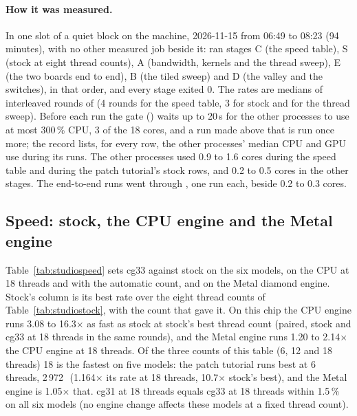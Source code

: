 \paragraph{How it was measured.} In one slot of a quiet block on the machine, 2026-11-15 from 06:49 to 08:23 (94
minutes), with no other measured job beside it:  ran stages C (the speed table), S
(stock at eight thread counts), A (bandwidth, kernels and the thread sweep), E (the two boards end to end), B (the tiled
sweep) and D (the valley and the switches), in that order, and every stage exited 0. The rates are medians of interleaved
rounds of  (4 rounds for the speed table, 3 for stock and for the thread sweep). Before each run the gate
() waits up to 20\,s for the other processes to use at most 300\,\% CPU, 3 of the 18 cores,
and a run made above that is run once more; the record lists, for every row, the other processes' median CPU and GPU use during
its runs. The other processes used 0.9 to 1.6 cores during the speed table and during the patch tutorial's stock rows,
and 0.2 to 0.5 cores in the other stages. The end-to-end runs went through , one run each, beside 0.2
to 0.3 cores.

\subsection*{Speed: stock, the CPU engine and the Metal engine}
Table~\ref{tab:studiospeed} sets cg33 against stock on the six models, on the CPU at 18 threads and with the automatic
count, and on the Metal diamond engine. Stock's column is its best rate over the eight thread counts of
Table~\ref{tab:studiostock}, with the count that gave it. On this chip the CPU engine runs 3.08 to 16.3$\times$ as fast as
stock at stock's best thread count (paired, stock and cg33 at 18 threads in the same rounds), and the Metal engine runs
1.20 to 2.14$\times$ the CPU engine at 18 threads. Of the three counts of this table (6, 12 and 18 threads) 18 is the fastest on five models: the
patch tutorial runs best at 6 threads, 2\,972\,\MC\ (1.164$\times$ its rate at 18 threads, 10.7$\times$ stock's best), and
the Metal engine is 1.05$\times$ that. cg31 at 18 threads equals cg33 at 18 threads within 1.5\,\% on all six models (no
engine change affects these models at a fixed thread count).

